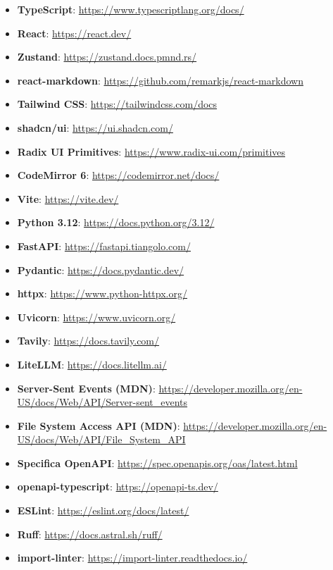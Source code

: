 \documentclass[a4paper, 10pt]{article}
\begin{document}
\begin{itemize}
    \setlength{\itemsep}{0pt}
    \item \textbf{TypeScript}: \url{https://www.typescriptlang.org/docs/}
    \item \textbf{React}: \url{https://react.dev/}
    \item \textbf{Zustand}: \url{https://zustand.docs.pmnd.rs/}
    \item \textbf{react-markdown}: \url{https://github.com/remarkjs/react-markdown}
    \item \textbf{Tailwind CSS}: \url{https://tailwindcss.com/docs}
    \item \textbf{shadcn/ui}: \url{https://ui.shadcn.com/}
    \item \textbf{Radix UI Primitives}: \url{https://www.radix-ui.com/primitives}
    \item \textbf{CodeMirror 6}: \url{https://codemirror.net/docs/}
    \item \textbf{Vite}: \url{https://vite.dev/}
    \item \textbf{Python 3.12}: \url{https://docs.python.org/3.12/}
    \item \textbf{FastAPI}: \url{https://fastapi.tiangolo.com/}
    \item \textbf{Pydantic}: \url{https://docs.pydantic.dev/}
    \item \textbf{httpx}: \url{https://www.python-httpx.org/}
    \item \textbf{Uvicorn}: \url{https://www.uvicorn.org/}
    \item \textbf{Tavily}: \url{https://docs.tavily.com/}
    \item \textbf{LiteLLM}: \url{https://docs.litellm.ai/}
    \item \textbf{Server-Sent Events (MDN)}: \url{https://developer.mozilla.org/en-US/docs/Web/API/Server-sent_events}
    \item \textbf{File System Access API (MDN)}: \url{https://developer.mozilla.org/en-US/docs/Web/API/File_System_API}
    \item \textbf{Specifica OpenAPI}: \url{https://spec.openapis.org/oas/latest.html}
    \item \textbf{openapi-typescript}: \url{https://openapi-ts.dev/}
    \item \textbf{ESLint}: \url{https://eslint.org/docs/latest/}
    \item \textbf{Ruff}: \url{https://docs.astral.sh/ruff/}
    \item \textbf{import-linter}: \url{https://import-linter.readthedocs.io/}

\end{itemize}
\end{document}
